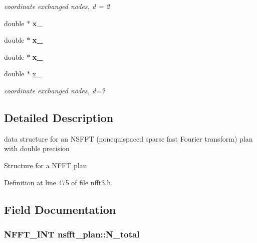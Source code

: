 \begin{DoxyCompactItemize}
\begin{DoxyCompactList}\small\item\em coordinate exchanged nodes, d = 2 \end{DoxyCompactList}\item 
\hypertarget{structnsfft__plan_a56345708a95cbcd3ee2ebf472607f274}{double $\ast$ {\bfseries x\-\_}}\label{structnsfft__plan_a56345708a95cbcd3ee2ebf472607f274}

\item 
\hypertarget{structnsfft__plan_ad47d5d52d2abf71be638f1b6859c3080}{double $\ast$ {\bfseries x\-\_}}\label{structnsfft__plan_ad47d5d52d2abf71be638f1b6859c3080}

\item 
\hypertarget{structnsfft__plan_ab67c4a556040bc7699980cf02bf6c8a7}{double $\ast$ {\bfseries x\-\_}}\label{structnsfft__plan_ab67c4a556040bc7699980cf02bf6c8a7}

\item 
\hypertarget{structnsfft__plan_aee5ad936bb790f00bf0797c94e185549}{double $\ast$ \hyperlink{structnsfft__plan_aee5ad936bb790f00bf0797c94e185549}{x\-\_}}\label{structnsfft__plan_aee5ad936bb790f00bf0797c94e185549}

\begin{DoxyCompactList}\small\item\em coordinate exchanged nodes, d=3 \end{DoxyCompactList}\end{DoxyCompactItemize}


\subsection{Detailed Description}
data structure for an N\-S\-F\-F\-T (nonequispaced sparse fast Fourier transform) plan with double precision 

Structure for a N\-F\-F\-T plan 

Definition at line 475 of file nfft3.\-h.



\subsection{Field Documentation}
\hypertarget{structnsfft__plan_aeb21834ddae13a39cc1de3f66cd28e56}{
\subsubsection[{N\-\_\-total}]{\setlength{\rightskip}{0pt plus 5cm}N\-F\-F\-T\-\_\-\-I\-N\-T nsfft\-\_\-plan\-::\-N\-\_\-total}}\label{structnsfft__plan_aeb21834ddae13a39cc1de3f66cd28e56}



